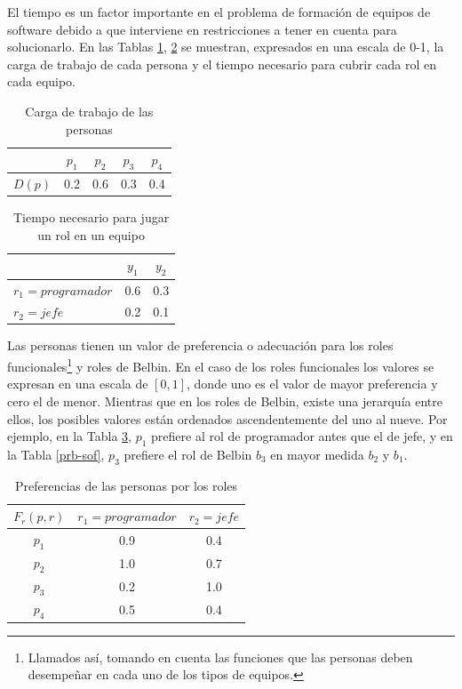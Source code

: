 El tiempo es un factor importante en el problema de formación de equipos de software debido a que interviene en restricciones a tener en cuenta para solucionarlo. En las Tablas \ref{tp-sof}, \ref{tr-sof} se muestran, expresados en una escala de 0-1, la carga de trabajo de cada persona y el tiempo necesario para cubrir cada rol en cada equipo. 


\begin{table}[H]
	\centering
	\caption{Carga de trabajo de las personas}\label{tp-sof}
	\begin{tabular}{|c|c|c|c|c|}
		\cline{2-5}
		\multicolumn{1}{c|}{} & $p_1$ & $p_2$ & $p_3$  & $p_4$ \\ \hline
		$D(p)$    & 0.2 & 0.6 & 0.3 & 0.4 \\ \hline
	\end{tabular}
\end{table}

\begin{table}[H]
  \centering
  \caption{Tiempo necesario para jugar un rol en un equipo}\label{tr-sof}
\begin{tabular}{|l|c|c|}
	\hline
	\thead{$T(r,y)$}  & $y_1$ & $y_2$ \\ \hline
	$r_1=programador$ &  0.6  &  0.3  \\ \hline
	$r_2=jefe$        &  0.2  &  0.1  \\ \hline
\end{tabular}
\end{table}


Las personas tienen un valor de preferencia o adecuación para los roles funcionales\footnote{Llamados así, tomando en cuenta las funciones que las personas deben desempeñar en cada uno de los tipos de equipos.} y roles de Belbin. En el caso de los roles funcionales los valores se expresan en una escala de $[0, 1]$, donde uno es el valor de mayor preferencia y cero el de menor. Mientras que en los roles de Belbin, existe una jerarquía entre ellos, los posibles valores están ordenados ascendentemente del uno al nueve. Por ejemplo, en la Tabla \ref{pr-sof}, $p_1$ prefiere al rol de programador antes que el de jefe, y en la Tabla \ref{prb-sof}, $p_3$ prefiere el rol de Belbin $b_3$ en mayor medida $b_2$ y $b_1$.

\begin{table}[H]
  \centering
  \caption{Preferencias de las personas por los roles}\label{pr-sof}
\begin{tabular}{|c|c|c|}
	\hline
	$F_r(p,r)$ & $r_1=programador$ & $r_2=jefe$ \\ \hline
	  $p_1$    &        0.9        &    0.4     \\ \hline
	  $p_2$    &        1.0        &    0.7     \\ \hline
	  $p_3$    &        0.2        &    1.0     \\ \hline
	  $p_4$    &        0.5        &    0.4     \\ \hline
\end{tabular}
\end{table}

